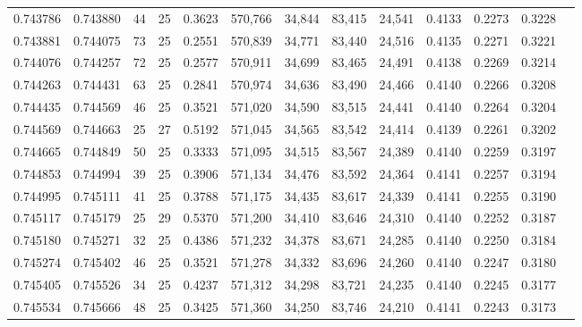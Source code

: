 \begin{tabular}{rrrrrrrrrrrrr}
0.743786 & 0.743880 &    44 &  25 &                                     0.3623 & 570,766 &  34,844 &  83,415 &  24,541 & 0.4133 & 0.2273 & 0.3228 \\
0.743881 & 0.744075 &    73 &  25 &                                     0.2551 & 570,839 &  34,771 &  83,440 &  24,516 & 0.4135 & 0.2271 & 0.3221 \\
0.744076 & 0.744257 &    72 &  25 &                                     0.2577 & 570,911 &  34,699 &  83,465 &  24,491 & 0.4138 & 0.2269 & 0.3214 \\
0.744263 & 0.744431 &    63 &  25 &                                     0.2841 & 570,974 &  34,636 &  83,490 &  24,466 & 0.4140 & 0.2266 & 0.3208 \\
0.744435 & 0.744569 &    46 &  25 &                                     0.3521 & 571,020 &  34,590 &  83,515 &  24,441 & 0.4140 & 0.2264 & 0.3204 \\
0.744569 & 0.744663 &    25 &  27 &                                     0.5192 & 571,045 &  34,565 &  83,542 &  24,414 & 0.4139 & 0.2261 & 0.3202 \\
0.744665 & 0.744849 &    50 &  25 &                                     0.3333 & 571,095 &  34,515 &  83,567 &  24,389 & 0.4140 & 0.2259 & 0.3197 \\
0.744853 & 0.744994 &    39 &  25 &                                     0.3906 & 571,134 &  34,476 &  83,592 &  24,364 & 0.4141 & 0.2257 & 0.3194 \\
0.744995 & 0.745111 &    41 &  25 &                                     0.3788 & 571,175 &  34,435 &  83,617 &  24,339 & 0.4141 & 0.2255 & 0.3190 \\
0.745117 & 0.745179 &    25 &  29 &                                     0.5370 & 571,200 &  34,410 &  83,646 &  24,310 & 0.4140 & 0.2252 & 0.3187 \\
0.745180 & 0.745271 &    32 &  25 &                                     0.4386 & 571,232 &  34,378 &  83,671 &  24,285 & 0.4140 & 0.2250 & 0.3184 \\
0.745274 & 0.745402 &    46 &  25 &                                     0.3521 & 571,278 &  34,332 &  83,696 &  24,260 & 0.4140 & 0.2247 & 0.3180 \\
0.745405 & 0.745526 &    34 &  25 &                                     0.4237 & 571,312 &  34,298 &  83,721 &  24,235 & 0.4140 & 0.2245 & 0.3177 \\
0.745534 & 0.745666 &    48 &  25 &                                     0.3425 & 571,360 &  34,250 &  83,746 &  24,210 & 0.4141 & 0.2243 & 0.3173 \\

\end{tabular}
